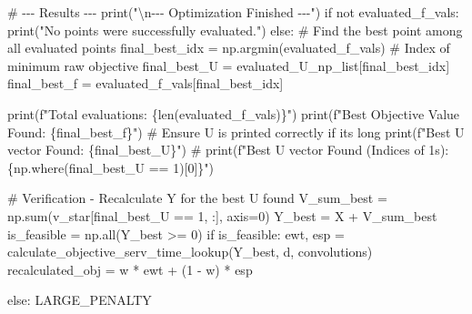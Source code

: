 \documentclass[
  letterpaper,
  DIV=11,
  numbers=noendperiod]{scrartcl}
\newenvironment{Shaded}{\begin{snugshade}}{\end{snugshade}}
\newcommand{\BuiltInTok}[1]{\textcolor[rgb]{0.00,0.23,0.31}{#1}}
\newcommand{\CharTok}[1]{\textcolor[rgb]{0.13,0.47,0.30}{#1}}
\newcommand{\CommentTok}[1]{\textcolor[rgb]{0.37,0.37,0.37}{#1}}
\newcommand{\ControlFlowTok}[1]{\textcolor[rgb]{0.00,0.23,0.31}{#1}}
\newcommand{\DecValTok}[1]{\textcolor[rgb]{0.68,0.00,0.00}{#1}}
\newcommand{\KeywordTok}[1]{\textcolor[rgb]{0.00,0.23,0.31}{#1}}
\newcommand{\NormalTok}[1]{\textcolor[rgb]{0.00,0.23,0.31}{#1}}
\newcommand{\OperatorTok}[1]{\textcolor[rgb]{0.37,0.37,0.37}{#1}}
\newcommand{\SpecialCharTok}[1]{\textcolor[rgb]{0.37,0.37,0.37}{#1}}
\newcommand{\SpecialStringTok}[1]{\textcolor[rgb]{0.13,0.47,0.30}{#1}}
\newcommand{\StringTok}[1]{\textcolor[rgb]{0.13,0.47,0.30}{#1}}
\begin{document}
\begin{Shaded}
\begin{Highlighting}[]
\CommentTok{\# {-}{-}{-} Results {-}{-}{-}}
\BuiltInTok{print}\NormalTok{(}\StringTok{"}\CharTok{\textbackslash{}n}\StringTok{{-}{-}{-} Optimization Finished {-}{-}{-}"}\NormalTok{)}
\ControlFlowTok{if} \KeywordTok{not}\NormalTok{ evaluated\_f\_vals:}
    \BuiltInTok{print}\NormalTok{(}\StringTok{"No points were successfully evaluated."}\NormalTok{)}
\ControlFlowTok{else}\NormalTok{:}
    \CommentTok{\# Find the best point among all evaluated points}
\NormalTok{    final\_best\_idx }\OperatorTok{=}\NormalTok{ np.argmin(evaluated\_f\_vals) }\CommentTok{\# Index of minimum raw objective}
\NormalTok{    final\_best\_U }\OperatorTok{=}\NormalTok{ evaluated\_U\_np\_list[final\_best\_idx]}
\NormalTok{    final\_best\_f }\OperatorTok{=}\NormalTok{ evaluated\_f\_vals[final\_best\_idx]}

    \BuiltInTok{print}\NormalTok{(}\SpecialStringTok{f"Total evaluations: }\SpecialCharTok{\{}\BuiltInTok{len}\NormalTok{(evaluated\_f\_vals)}\SpecialCharTok{\}}\SpecialStringTok{"}\NormalTok{)}
    \BuiltInTok{print}\NormalTok{(}\SpecialStringTok{f"Best Objective Value Found: }\SpecialCharTok{\{}\NormalTok{final\_best\_f}\SpecialCharTok{\}}\SpecialStringTok{"}\NormalTok{)}
    \CommentTok{\# Ensure U is printed correctly if it\textquotesingle{}s long}
    \BuiltInTok{print}\NormalTok{(}\SpecialStringTok{f"Best U vector Found: }\SpecialCharTok{\{}\NormalTok{final\_best\_U}\SpecialCharTok{\}}\SpecialStringTok{"}\NormalTok{)}
    \CommentTok{\# print(f"Best U vector Found (Indices of 1s): \{np.where(final\_best\_U == 1)[0]\}")}


    \CommentTok{\# Verification {-} Recalculate Y for the best U found}
\NormalTok{    V\_sum\_best }\OperatorTok{=}\NormalTok{ np.}\BuiltInTok{sum}\NormalTok{(v\_star[final\_best\_U }\OperatorTok{==} \DecValTok{1}\NormalTok{, :], axis}\OperatorTok{=}\DecValTok{0}\NormalTok{)}
\NormalTok{    Y\_best }\OperatorTok{=}\NormalTok{ X }\OperatorTok{+}\NormalTok{ V\_sum\_best}
\NormalTok{    is\_feasible }\OperatorTok{=}\NormalTok{ np.}\BuiltInTok{all}\NormalTok{(Y\_best }\OperatorTok{\textgreater{}=} \DecValTok{0}\NormalTok{)}
    \ControlFlowTok{if}\NormalTok{ is\_feasible:}
\NormalTok{        ewt, esp }\OperatorTok{=}\NormalTok{ calculate\_objective\_serv\_time\_lookup(Y\_best, d, convolutions)}
\NormalTok{        recalculated\_obj }\OperatorTok{=}\NormalTok{ w }\OperatorTok{*}\NormalTok{ ewt }\OperatorTok{+}\NormalTok{ (}\DecValTok{1} \OperatorTok{{-}}\NormalTok{ w) }\OperatorTok{*}\NormalTok{ esp}
        
    \ControlFlowTok{else}\NormalTok{:}
\NormalTok{        LARGE\_PENALTY}


\end{Highlighting}
\end{Shaded}
\end{document}
